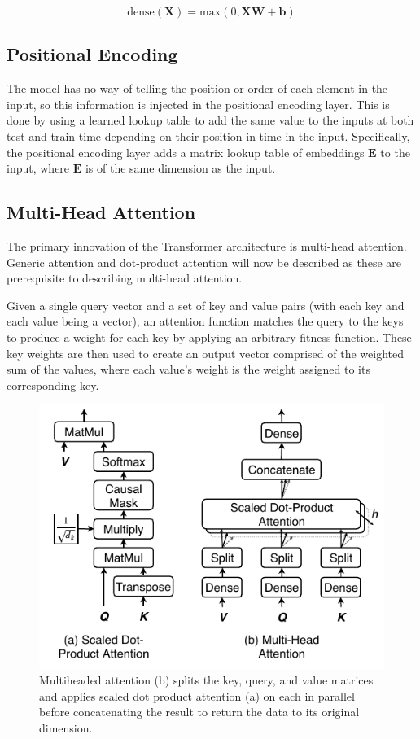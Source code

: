 \begin{equation} \label{dense_layer}
\text{dense}(\boldsymbol{X}) = \text{max}(0, \boldsymbol{XW} + \boldsymbol{b})
\end{equation}

\subsection{Positional Encoding} \label{sec:positional_encoding}
The model has no way of telling the position or order of each element in the input, so this information is injected in the positional encoding layer.
This is done by using a learned lookup table to add the same value to the inputs at both test and train time depending on their position in time in the input.
Specifically, the positional encoding layer adds a matrix lookup table of embeddings $\boldsymbol{E}$ to the input, where $\boldsymbol{E}$ is of the same dimension as the input.

\subsection{Multi-Head Attention} \label{multihead_attention}
The primary innovation of the Transformer architecture is multi-head attention.
Generic attention and dot-product attention will now be described as these are prerequisite to describing multi-head attention.

Given a single query vector and a set of key and value pairs (with each key and each value being a vector), an attention function matches the query to the keys to produce a weight for each key by applying an arbitrary fitness function.
These key weights are then used to create an output vector comprised of the weighted sum of the values, where each value's weight is the weight assigned to its corresponding key. 

\begin{figure}[htbp]
	\centerline{\includegraphics[width=.35\textwidth]{images/multihead_attn.pdf}}
	\caption{Multiheaded attention (b) splits the key, query, and value matrices and applies scaled dot product attention (a) on each in parallel before concatenating the result to return the data to its original dimension.}
	\label{fig:multihead}
\end{figure}

